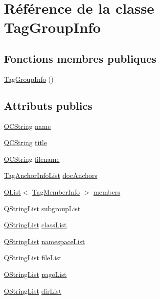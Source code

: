 \hypertarget{class_tag_group_info}{}\section{Référence de la classe Tag\+Group\+Info}
\label{class_tag_group_info}
\subsection*{Fonctions membres publiques}
\begin{DoxyCompactItemize}
\item 
\hyperlink{class_tag_group_info_a061ecfc664c217e16b78f61e5484ce99}{Tag\+Group\+Info} ()
\end{DoxyCompactItemize}
\subsection*{Attributs publics}
\begin{DoxyCompactItemize}
\item 
\hyperlink{class_q_c_string}{Q\+C\+String} \hyperlink{class_tag_group_info_affa871defcfc2321f6897fc91fd1a585}{name}
\item 
\hyperlink{class_q_c_string}{Q\+C\+String} \hyperlink{class_tag_group_info_a985d71c6502715a18d431e87f70abd53}{title}
\item 
\hyperlink{class_q_c_string}{Q\+C\+String} \hyperlink{class_tag_group_info_a29015cfc8a0dfd3c85195a89df934e18}{filename}
\item 
\hyperlink{class_tag_anchor_info_list}{Tag\+Anchor\+Info\+List} \hyperlink{class_tag_group_info_a44b3fd0436ffa10f91155a7c0e7e957b}{doc\+Anchors}
\item 
\hyperlink{class_q_list}{Q\+List}$<$ \hyperlink{class_tag_member_info}{Tag\+Member\+Info} $>$ \hyperlink{class_tag_group_info_a043b00429c1dd064f2f00e6ad2c0ba26}{members}
\item 
\hyperlink{class_q_string_list}{Q\+String\+List} \hyperlink{class_tag_group_info_aba982dd5a218d3d074fa84b6b7951051}{subgroup\+List}
\item 
\hyperlink{class_q_string_list}{Q\+String\+List} \hyperlink{class_tag_group_info_a8a92f708400a1535b7956614d2abe0df}{class\+List}
\item 
\hyperlink{class_q_string_list}{Q\+String\+List} \hyperlink{class_tag_group_info_a475bde4c723d36e10c002b3293a3dbfc}{namespace\+List}
\item 
\hyperlink{class_q_string_list}{Q\+String\+List} \hyperlink{class_tag_group_info_ac2cddc9420313b4a0a2a72d93655ddf2}{file\+List}
\item 
\hyperlink{class_q_string_list}{Q\+String\+List} \hyperlink{class_tag_group_info_a4220d465d7554ad414359cd6425eebe4}{page\+List}
\item 
\hyperlink{class_q_string_list}{Q\+String\+List} \hyperlink{class_tag_group_info_a22c2d918db72aa6e1db74c1d06690f25}{dir\+List}
\end{DoxyCompactItemize}


